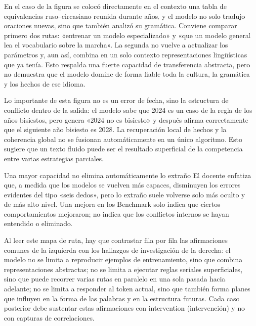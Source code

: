 En el caso de la figura se colocó directamente en el contexto una tabla de equivalencias ruso--circasiano reunida durante años, y el modelo no solo tradujo oraciones nuevas, sino que también analizó su gramática. Conviene comparar primero dos rutas: «entrenar un modelo especializado» y «que un modelo general lea el vocabulario sobre la marcha». La segunda no vuelve a actualizar los parámetros y, aun así, combina en un solo contexto representaciones lingüísticas que ya tenía. Esto respalda una fuerte capacidad de transferencia abstracta, pero no demuestra que el modelo domine de forma fiable toda la cultura, la gramática y los hechos de ese idioma.


Lo importante de esta figura no es un error de fecha, sino la estructura de conflicto dentro de la salida: el modelo sabe que 2024 es un caso de la regla de los años bisiestos, pero genera «2024 no es bisiesto» y después afirma correctamente que el siguiente año bisiesto es 2028. La recuperación local de hechos y la coherencia global no se fusionan automáticamente en un único algoritmo. Esto sugiere que un texto fluido puede ser el resultado superficial de la competencia entre varias estrategias parciales.

\begin{warningbox}{Una mayor capacidad no elimina automáticamente lo extraño}
El docente enfatiza que, a medida que los modelos se vuelven más capaces, disminuyen los errores evidentes del tipo «seis dedos», pero lo extraño suele volverse solo más oculto y de más alto nivel. Una mejora en los Benchmark solo indica que ciertos comportamientos mejoraron; no indica que los conflictos internos se hayan entendido o eliminado.
\end{warningbox}


Al leer este mapa de ruta, hay que contrastar fila por fila las afirmaciones comunes de la izquierda con los hallazgos de investigación de la derecha: el modelo no se limita a reproducir ejemplos de entrenamiento, sino que combina representaciones abstractas; no se limita a ejecutar reglas seriales superficiales, sino que puede recorrer varias rutas en paralelo en una sola pasada hacia adelante; no se limita a responder al token actual, sino que también forma planes que influyen en la forma de las palabras y en la estructura futuras. Cada caso posterior debe sustentar estas afirmaciones con intervention (intervención) y no con capturas de correlaciones.

